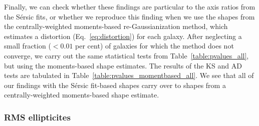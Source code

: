 \documentclass[twocolumn,useAMS,usenatbib]{mn2e}
\newcommand{\sersic}{S\'{e}rsic }
\begin{document}
Finally, we can check whether these findings are particular to the
axis ratios from the \sersic fits, or whether we reproduce this
finding when we use the shapes from the centrally-weighted
moments-based re-Gaussianization method, which estimates a distortion
(Eq.~\ref{eq:distortion}) for each galaxy. 
After neglecting a small fraction ($<0.01$ per cent) of galaxies for
which the method does not converge, 
we carry out the same statistical tests from
Table~\ref{table:pvalues_all}, but using the moments-based shape
estimates.  The results of the KS and AD tests are tabulated in Table~\ref{table:pvalues_momentbased_all}.
We see that all of our findings with the \sersic fit-based shapes
carry over to shapes from a centrally-weighted moments-based shape
estimate.

\subsubsection{RMS ellipticites}
\end{document}
